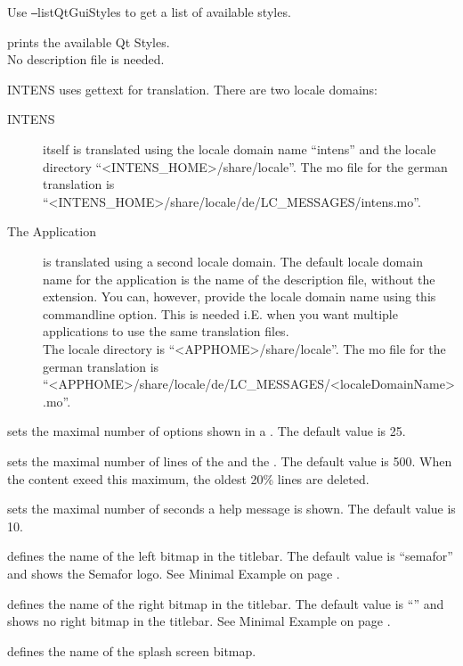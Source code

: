 \begin{description}
  Use \texttt{--}listQtGuiStyles to get a list of available styles.
%
\item[\texttt{--}listQtGuiStyles] prints the available Qt Styles. \\
  No description file is needed.
%
\item[\texttt{--}localeDomain <argument>]
  INTENS uses gettext for translation. There are two locale domains:
  \begin{description}
  \item[INTENS] itself is translated using the locale domain name ``intens''
  and the locale directory ``<INTENS\_HOME>/share/locale''.
  The mo file for the german translation is
  ``<INTENS\_HOME>/share/locale/de/LC\_MESSAGES/intens.mo''.
  \item[The Application] is translated using a second locale domain.
  The default locale domain name for the application is the name
  of the description file, without the extension. You can, however,
  provide the locale domain name using this commandline option.
  This is needed i.E. when you want multiple applications to use the
  same translation files. \\
  The locale directory is ``<APPHOME>/share/locale''.
  The mo file for the german translation is
  ``<APPHOME>/share/locale/de/LC\_MESSAGES/<localeDomainName>.mo''.
  \end{description}
%
\item[\texttt{--}maxoptions <argument>] sets the maximal number of options shown in a \COMBOBOX.
  The default value is 25.
%
\item[\texttt{--}maxlines <argument>] sets the maximal number of lines of the \LOGWINDOW{} and the \STDWINDOW{}.
  The default value is 500.
  When the content exeed this maximum, the oldest 20\% lines are deleted.
%
\item[\texttt{--}toolTipDuration <argument>] sets the maximal number of seconds a help message is shown.
  The default value is 10.
%
\item[\texttt{--}leftIcon <argument>] defines the name of the left bitmap in the titlebar.
  The default value is ``semafor'' and shows the Semafor logo.
  See Minimal Example on page \pageref{fig:minimalExample}.
%
\item[\texttt{--}rightIcon <argument>] defines the name of the right bitmap in the titlebar.
  The default value is ``'' and shows no right bitmap in the titlebar.
  See Minimal Example on page \pageref{fig:minimalExample}.
%
\item[\texttt{--}startupImage <argument>] defines the name of the splash screen bitmap.

\end{description}
